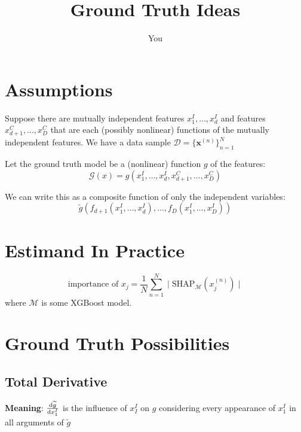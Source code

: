 \documentclass{article}
\title{Ground Truth Ideas}
\author{You}
\theoremstyle{definition}
\begin{document}
\maketitle

\section{Assumptions}
Suppose there are mutually independent features $x_1^I,\ldots,x_d^I$ and features $x_{d+1}^C,\ldots,x_D^C$ that are each (possibly nonlinear) functions of the mutually independent features. We have a data sample $\mathcal{D} = \{\mathbf{x}^{(n)}\}_{n=1}^N$

Let the ground truth model be a (nonlinear) function $g$ of the features:
\begin{equation*}
    \mathcal{G}(x) = g(x_1^I,\ldots,x_d^I,x_{d+1}^C,\ldots,x_D^C)
\end{equation*}

We can write this as a composite function of only the independent variables:
\begin{equation*}
    \widetilde{g}(f_{d+1}(x_1^I,\ldots,x_d^I),\ldots,f_D(x_1^I,\ldots,x_D^I))
\end{equation*}

\section{Estimand In Practice}
\begin{equation*}
    \text{importance of } x_j = \frac{1}{N} \sum_{n=1}^N \mid \text{SHAP}_\mathcal{M}(x_j^{(n)}) \mid 
\end{equation*}
where $\mathcal{M}$ is some XGBoost model. 

\section{Ground Truth Possibilities}
    \subsection{Total Derivative}
        \textbf{Meaning}: $\dv{\widetilde{g}}{x_1^I}$ is the influence of $x_I^I$ on $g$ considering every appearance of $x_1^I$ in all arguments of $\widetilde{g}$
\end{document}
